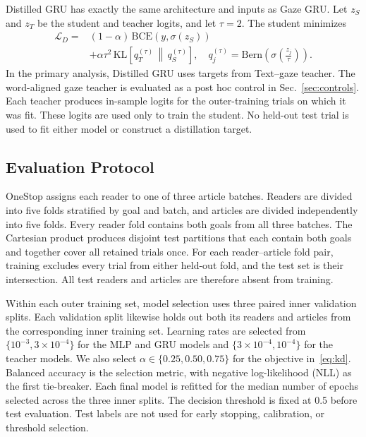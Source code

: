 \documentclass[conference,letterpaper]{IEEEtran}
\newcommand{\modelGru}{Gaze GRU}
\newcommand{\modelTeacher}{Text--gaze teacher}
\newcommand{\modelDistill}{Distilled GRU}
\begin{document}
\modelDistill{} has exactly the same architecture and inputs as \modelGru{}.
Let $z_S$ and $z_T$ be the student and teacher logits, and let $\tau=2$.  The
student minimizes
\begin{equation}
\begin{aligned}
\mathcal{L}_D={}&(1-\alpha)\,\mathrm{BCE}(y,\sigma(z_S))\\
&+\alpha\tau^2\,\mathrm{KL}\!\left[
q_T^{(\tau)}\,\middle\|\,q_S^{(\tau)}\right],
\quad q_j^{(\tau)}=\mathrm{Bern}\!\left(\sigma\!\left(\frac{z_j}{\tau}\right)\right).
\end{aligned}
\label{eq:kd}
\end{equation}
In the primary analysis, \modelDistill{} uses targets from \modelTeacher{}.
The word-aligned gaze teacher is evaluated as a post hoc control in
Sec.~\ref{sec:controls}.
Each teacher produces in-sample logits for the outer-training trials on which
it was fit.  These logits are used only to train the student.  No held-out test
trial is used to fit either model or construct a distillation target.

\subsection{Evaluation Protocol}

OneStop assigns each reader to one of three article batches.  Readers are
divided into five folds stratified by goal and batch, and articles are divided
independently into five folds.  Every reader fold contains both goals from all
three batches.  The Cartesian product produces disjoint test partitions that
each contain both goals and together cover all retained trials once.  For each
reader--article fold pair, training excludes every trial from either held-out
fold, and the test set is their intersection.  All test readers and articles
are therefore absent from training.

Within each outer training set, model selection uses three paired inner
validation splits.  Each validation split likewise holds out both its readers
and articles from the corresponding inner training set.  Learning rates are
selected from
$\{10^{-3},3\!\times\!10^{-4}\}$ for the MLP and GRU models and
$\{3\!\times\!10^{-4},10^{-4}\}$ for the teacher models.  We also select
$\alpha\in\{0.25,0.50,0.75\}$ for the objective in~\eqref{eq:kd}.  Balanced
accuracy is the selection metric, with negative log-likelihood (NLL) as the
first tie-breaker.
Each final model is refitted for the median number of epochs selected across
the three inner splits.  The decision threshold is fixed at 0.5 before test
evaluation.  Test labels are not used for early stopping, calibration, or
threshold selection.
\end{document}
